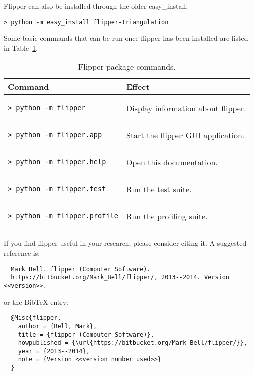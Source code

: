 \documentclass[a4paper]{article}
\begin{document}
Flipper can also be installed through the older easy\_install:
\begin{lstlisting}
> python -m easy_install flipper-triangulation
\end{lstlisting}

Some basic commands that can be run once flipper has been installed are listed in Table~\ref{tbl:package_commands}.

\begin{table}[ht]
\label{tbl:package_commands}
\begin{center}
\begin{tabular}{l|l}
Command & Effect \\
\hline
\begin{lstlisting}
> python -m flipper
\end{lstlisting} & Display information about flipper. \\

\begin{lstlisting}
> python -m flipper.app
\end{lstlisting} & Start the flipper GUI application. \\

\begin{lstlisting}
> python -m flipper.help
\end{lstlisting} & Open this documentation. \\

\begin{lstlisting}
> python -m flipper.test
\end{lstlisting} & Run the test suite. \\

\begin{lstlisting}
> python -m flipper.profile
\end{lstlisting} & Run the profiling suite. \\
\end{tabular}
\end{center}
\caption{Flipper package commands.}
\end{table}

If you find flipper useful in your research, please consider citing it. A suggested reference is:
\begin{verbatim}
  Mark Bell. flipper (Computer Software).
  https://bitbucket.org/Mark_Bell/flipper/, 2013--2014. Version <<version>>.
\end{verbatim}
or the BibTeX entry:
\begin{verbatim}
  @Misc{flipper,
    author = {Bell, Mark},
    title = {flipper (Computer Software)},
    howpublished = {\url{https://bitbucket.org/Mark_Bell/flipper/}},
    year = {2013--2014},
    note = {Version <<version number used>>}
  }
\end{verbatim}
\end{document}
